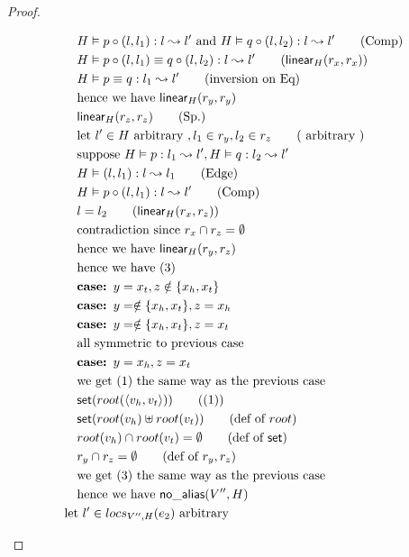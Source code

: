 \documentclass[11pt]{article}
\newcommand{\ms}[1]{\ensuremath{\mathsf{#1}}}
\newcommand{\na}[2]{\mathsf{no\_alias}(#1,#2)}
\begin{document}
\begin{proof}
\begin{description}
\begin{align*}
  &\quad H \vDash p \circ (l,l_1) : l \leadsto l' \text{ and }  H \vDash q \circ (l,l_2) : l \leadsto l' \tag{Comp}\\
  &\quad H \vDash p \circ (l,l_1) \equiv q \circ (l,l_2) : l \leadsto l' \tag{$\ms{linear}_H(r_x,r_x)$}\\
  &\quad H \vDash p \equiv q : l_1 \leadsto l' \tag{inversion on Eq}\\
  &\quad \text{hence we have } \ms{linear}_H(r_y,r_y)\\
  &\quad \ms{linear}_H(r_z,r_z) \tag{Sp.}\\
  &\quad \text{let } l' \in H \text{ arbitrary }, l_1 \in r_y, l_2 \in r_z \tag{ arbitrary }\\
  &\quad \text{suppose } H \vDash p : l_1 \leadsto l', H \vDash q : l_2 \leadsto l'\\
  &\quad H \vDash (l,l_1) : l \leadsto l_1 \tag{Edge}\\
  &\quad H \vDash p \circ (l,l_1) : l \leadsto l' \tag{Comp}\\
  &\quad l = l_2 \tag{$\ms{linear}_H(r_x,r_z)$}\\
  &\quad \text{contradiction since } r_x \cap r_z = \emptyset\\
  &\quad \text{hence we have } \ms{linear}_H(r_y,r_z)\\
  &\quad \text{hence we have (3)}\\
  &\quad\textbf{case: } y = x_t, z \notin \{x_h,x_t\}\\
  &\quad\textbf{case: } y = \notin \{x_h,x_t\}, z = x_h\\
  &\quad\textbf{case: } y = \notin \{x_h,x_t\}, z = x_t\\
  &\quad \text{all symmetric to previous case}\\
  &\quad\textbf{case: } y = x_h, z = x_t\\
  &\quad \text{we get (1) the same way as the previous case}\\
  &\quad \ms{set}(root(\pairexcst{v_h}{v_t})) \tag{(1)}\\
  &\quad \ms{set}(root(v_h) \uplus root(v_t)) \tag{def of $root$}\\
  &\quad root(v_h) \cap root(v_t) = \emptyset \tag{def of $\ms{set}$}\\
  &\quad r_y \cap r_z = \emptyset \tag{def of $r_y,r_z$}\\
  &\quad \text{we get (3) the same way as the previous case}\\
  &\quad \text{hence we have } \na{V''}{H}\\
  &\text{let } l' \in locs_{V'',H}(e_2) \text{ arbitrary }\\

\end{align*}
\end{description}
\end{proof}
\end{document}
